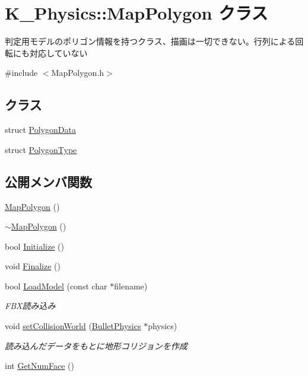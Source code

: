 \hypertarget{class_k___physics_1_1_map_polygon}{}\section{K\+\_\+\+Physics\+:\+:Map\+Polygon クラス}
\label{class_k___physics_1_1_map_polygon}


判定用モデルのポリゴン情報を持つクラス、描画は一切できない。行列による回転にも対応していない  




{\ttfamily \#include $<$Map\+Polygon.\+h$>$}

\subsection*{クラス}
\begin{DoxyCompactItemize}
\item 
struct \mbox{\hyperlink{struct_k___physics_1_1_map_polygon_1_1_polygon_data}{Polygon\+Data}}
\item 
struct \mbox{\hyperlink{struct_k___physics_1_1_map_polygon_1_1_polygon_type}{Polygon\+Type}}
\end{DoxyCompactItemize}
\subsection*{公開メンバ関数}
\begin{DoxyCompactItemize}
\item 
\mbox{\hyperlink{class_k___physics_1_1_map_polygon_af64be549128b41d162dbddac6d7114ae}{Map\+Polygon}} ()
\item 
\mbox{\hyperlink{class_k___physics_1_1_map_polygon_a6d567c81fe82421013c75f23e11449ef}{$\sim$\+Map\+Polygon}} ()
\item 
bool \mbox{\hyperlink{class_k___physics_1_1_map_polygon_aa8c2e118294dd0dfd4ae8b1cf031d9d0}{Initialize}} ()
\item 
void \mbox{\hyperlink{class_k___physics_1_1_map_polygon_a103457df47925a3259bda50b796bc949}{Finalize}} ()
\item 
bool \mbox{\hyperlink{class_k___physics_1_1_map_polygon_a2d2b5c00e23782bf9b205b74b7458e1d}{Load\+Model}} (const char $\ast$filename)
\begin{DoxyCompactList}\small\item\em F\+B\+X読み込み \end{DoxyCompactList}\item 
void \mbox{\hyperlink{class_k___physics_1_1_map_polygon_a17a4ee0e3fce46e74be6ce43f5a51d7e}{set\+Collision\+World}} (\mbox{\hyperlink{class_k___physics_1_1_bullet_physics}{Bullet\+Physics}} $\ast$physics)
\begin{DoxyCompactList}\small\item\em 読み込んだデータをもとに地形コリジョンを作成 \end{DoxyCompactList}\item 
int \mbox{\hyperlink{class_k___physics_1_1_map_polygon_a6266c6eeaea35b2e037f247e837c306f}{Get\+Num\+Face}} ()
\end{DoxyCompactItemize}


